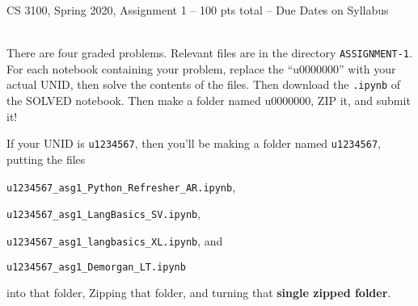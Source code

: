 \documentclass[12pt]{article}
\begin{document}



\begin{center}
\begin{large}
  CS 3100, Spring 2020, Assignment 1 -- 100 pts total -- Due Dates on Syllabus
  \ \\
  \ \\      
\end{large}


\end{center}
\date{}


\noindent There are four graded problems.
Relevant files are in the directory \verb|ASSIGNMENT-1|.
%
For each notebook containing your problem, replace the ``u0000000'' with your actual UNID,
then solve the contents of the files.
%
Then download the {\tt .ipynb} of the SOLVED notebook.
%
Then make a folder named u0000000, ZIP it, and submit it!


 If your UNID is     \verb|u1234567|, then you'll be
making a folder named \verb|u1234567|, putting the
files

\verb|u1234567_asg1_Python_Refresher_AR.ipynb|,

\verb|u1234567_asg1_LangBasics_SV.ipynb|,

\verb|u1234567_asg1_langbasics_XL.ipynb|, and

\verb|u1234567_asg1_Demorgan_LT.ipynb|

into that folder, Zipping that folder, and turning that {\bf single zipped folder}.
\end{document}
